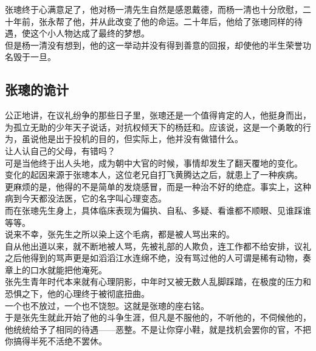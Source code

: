\begin{multicols}{\theparacolNo}
张璁终于心满意足了，他对杨一清先生自然是感恩戴德，而杨一清也十分欣慰，二十年前，张永帮了他，并从此改变了他的命运。二十年后，他给了张璁同样的待遇，使这个小人物达成了最终的梦想。\\

但是杨一清没有想到，他的这一举动并没有得到善意的回报，却使他的半生荣誉功名毁于一旦。\\

\subsection{张璁的诡计}
公正地讲，在议礼纷争的那些日子里，张璁还是一个值得肯定的人，他挺身而出，为孤立无助的少年天子说话，对抗权倾天下的杨廷和。应该说，这是一个勇敢的行为，虽说他是出于投机的目的，但实际上，他并没有做错什么。\\

让人认自己的父母，有错吗？\\

可是当他终于出人头地，成为朝中大官的时候，事情却发生了翻天覆地的变化。\\

变化的起因来源于张璁本人，这位老兄自打飞黄腾达之后，就患上了一种疾病。\\

更麻烦的是，他得的不是简单的发烧感冒，而是一种治不好的绝症。事实上，这种病到今天都没法医，它的名字叫心理变态。\\

而在张璁先生身上，具体临床表现为偏执、自私、多疑、看谁都不顺眼、见谁踩谁等等。\\

说来不幸，张先生之所以染上这个毛病，都是被人骂出来的。\\

自从他出道以来，就不断地被人骂，先被礼部的人欺负，连工作都不给安排，议礼之后他得到的骂声更是如滔滔江水连绵不绝，没有骂过他的人可谓是稀有动物，奏章上的口水就能把他淹死。\\

张先生青年时代本来就有心理阴影，中年时又被无数人乱脚踩踏，在极度的压力和恐惧之下，他的心理终于被彻底扭曲。\\

一个也不放过，一个也不饶恕。这就是张璁的座右铭。\\

于是张先生就此开始了他的斗争生涯，但凡是不服他的，不听他的，不伺候他的，他统统给予了相同的待遇——恶整。不是让你穿小鞋，就是找机会罢你的官，不把你搞得半死不活绝不罢休。\\


\end{multicols}
